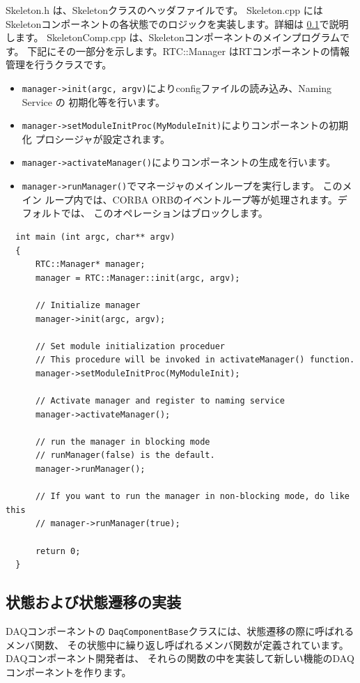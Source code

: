 \documentclass[a4j,10pt,dvips,onecolumn,oneside,final]{jarticle}%
\begin{document}
Skeleton.h は、Skeletonクラスのヘッダファイルです。
Skeleton.cpp にはSkeletonコンポーネントの各状態でのロジックを実装します。詳細は
\ref{trans}で説明します。
SkeletonComp.cpp は、Skeletonコンポーネントのメインプログラムです。
下記にその一部分を示します。RTC::Manager はRTコンポーネントの情報管理を行うクラスです。
\begin{itemize}
\item \verb|manager->init(argc, argv)|によりconfigファイルの読み込み、Naming Service の
  初期化等を行います。
\item \verb|manager->setModuleInitProc(MyModuleInit)|によりコンポーネントの初期化
プロシージャが設定されます。
\item \verb|manager->activateManager()|によりコンポーネントの生成を行います。
\item \verb|manager->runManager()|でマネージャのメインループを実行します。 このメイン
ループ内では、CORBA ORBのイベントループ等が処理されます。デフォルトでは、
このオペレーションはブロックします。
\end{itemize}

\begin{Verbatim}
  int main (int argc, char** argv)
  {
      RTC::Manager* manager;
      manager = RTC::Manager::init(argc, argv);
      
      // Initialize manager
      manager->init(argc, argv);

      // Set module initialization proceduer
      // This procedure will be invoked in activateManager() function.
      manager->setModuleInitProc(MyModuleInit);
    
      // Activate manager and register to naming service
      manager->activateManager();

      // run the manager in blocking mode
      // runManager(false) is the default.
      manager->runManager();

      // If you want to run the manager in non-blocking mode, do like this
      // manager->runManager(true);

      return 0;
  }
\end{Verbatim}

\subsection{状態および状態遷移の実装}\label{trans}
DAQコンポーネントの \verb|DaqComponentBase|クラスには、状態遷移の際に呼ばれるメンバ関数、
その状態中に繰り返し呼ばれるメンバ関数が定義されています。DAQコンポーネント開発者は、
それらの関数の中を実装して新しい機能のDAQコンポーネントを作ります。
\end{document}
